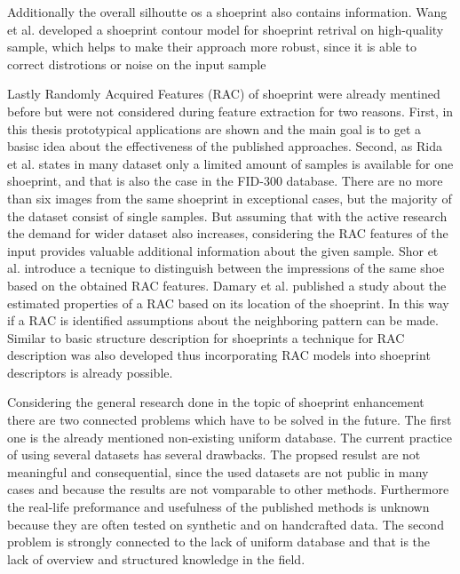 \documentclass[draft,final]{vutinfth} %
\begin{document}
Additionally the overall silhoutte os a shoeprint also contains information.
Wang et al. \cite{wang2014automatic} developed a shoeprint contour model for shoeprint retrival on high-quality sample, which helps to make their approach more robust, since it is able to correct distrotions or noise on the input sample
\par
Lastly Randomly Acquired Features (RAC) of shoeprint were already mentined before but were not considered during feature extraction for two reasons.
First, in this thesis prototypical applications are shown and the main goal is to get a basisc idea about the effectiveness of the published approaches.
Second, as Rida et al. \cite{rida2019forensic} states in many dataset only a limited amount of samples is available for one shoeprint, and that is also the case in the FID-300 database.
There are no more than six images from the same shoeprint in exceptional cases, but the majority of the dataset consist of single samples.
But assuming that with the active research the demand for wider dataset also increases, considering the RAC features of the input provides valuable additional information about the given sample.
Shor et al. \cite{shor2018inherent} introduce a tecnique to distinguish between the impressions of the same shoe based on the obtained RAC features.
Damary et al. \cite{damary2018dependence} published a study about the estimated properties of a RAC based on its location of the shoeprint.
In this way if a RAC is identified assumptions about the neighboring pattern can be made.
Similar to basic structure description for shoeprints \cite{tang2010footwear} a technique for RAC description was also developed \cite{speir2016quantifying} thus incorporating RAC models into shoeprint descriptors is already possible.
\par
Considering the general research done in the topic of shoeprint enhancement there are two connected problems which have to be solved in the future.
The first one is the already mentioned non-existing uniform database.
The current practice of using several datasets has several drawbacks.
The propsed resulst are not meaningful and consequential, since the used datasets are not public in many cases and because the results are not vomparable to other methods.
Furthermore the real-life preformance and usefulness of the published methods is unknown because they are often tested on synthetic and on handcrafted data.
The second problem is strongly connected to the lack of uniform database and that is the lack of overview and structured knowledge in the field.
\end{document}
